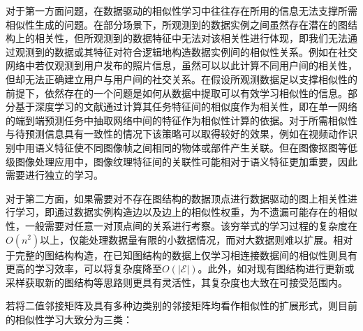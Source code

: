 对于第一方面问题，在数据驱动的相似性学习中往往存在所用的信息无法支撑所需相似性生成的问题。在部分场景下，所观测到的数据实例之间虽然存在潜在的图结构上的相关性，但所观测到的数据特征中无法对该相关性进行体现，即我们无法通过观测到的数据或其特征对符合逻辑地构造数据实例间的相似性关系。例如在社交网络中若仅观测到用户发布的照片信息，虽然可以以此计算不同用户间的相关性，但却无法正确建立用户与用户间的社交关系。在假设所观测数据足以支撑相似性的前提下，依然存在的一个问题是如何从数据中提取可以有效学习相似性的信息。部分基于深度学习的文献通过计算其任务特征间的相似度作为相关性\cite{velivckovic2017graph,wang2018non}，即在单一网络的端到端预测任务中抽取网络中间的特征作为相似性计算的依据。对于所需相似性与待预测信息具有一致性的情况下该策略可以取得较好的效果，例如在视频动作识别中用语义特征使不同图像帧之间相同的物体或部件产生关联\cite{wang2018non}。但在图像抠图等低级图像处理应用中，图像纹理特征间的关联性可能相对于语义特征更加重要，因此需要进行独立的学习。

对于第二方面，如果需要对不存在图结构的数据顶点进行数据驱动的图上相关性进行学习，即通过数据实例构造边以及边上的相似性权重，为不遗漏可能存在的相似性，一般需要对任意一对顶点间的关系进行考察。该穷举式的学习过程的复杂度在$O(n^2)$以上，仅能处理数据量有限的小数据情况，而对大数据则难以扩展。相对于完整的图结构构造，在已知图结构的数据上仅学习相连接数据间的相似性则具有更高的学习效率，可以将复杂度降至$O(|\mathcal{E}|)$。此外，如对现有图结构进行更新或采样获取新的图结构等思路则更具有灵活性，其复杂度也大致在可接受范围内。

若将二值邻接矩阵及具有多种边类别的邻接矩阵均看作相似性的扩展形式，则目前的相似性学习大致分为三类：

